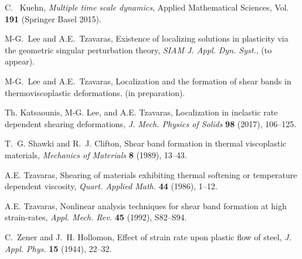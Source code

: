\documentclass[graybox]{svmult}
\begin{document}
\begin{thebibliography}{10}
{\sc C.~ Kuehn}, 
{\it Multiple time scale dynamics}, Applied Mathematical Sciences, Vol. {\bf 191} (Springer Basel 2015).
  
{\sc M-G.~Lee and A.E.~Tzavaras},
Existence of localizing solutions in plasticity via the geometric singular perturbation theory, 
{\em SIAM J. Appl. Dyn. Syst.}, (to appear). 

{\sc M-G.~Lee and A.E.~Tzavaras},
Localization and the formation of shear bands in thermoviscoplastic deformations. (in preparation).

{\sc Th. Katsaounis, M-G. Lee, and A.E. Tzavaras}, 
Localization in inelastic rate dependent shearing deformations, 
{\em J.  Mech. Physics of Solids} {\bf 98} (2017), 106--125.


{\sc T.~G. Shawki and R.~J. Clifton}, 
Shear band formation in thermal viscoplastic materials, 
{\em Mechanics of Materials} {\bf 8 } (1989), 13--43.

{\sc A.E. Tzavaras},
Shearing of materials exhibiting thermal softening or temperature dependent viscosity,
{\em Quart.  Applied Math.} {\bf 44} (1986), 1--12.


{\sc A.E. Tzavaras}, 
Nonlinear analysis techniques for shear band formation at high strain-rates, 
{\it Appl. Mech. Rev.}
{\bf  45} (1992), S82--S94.


{\sc C.~Zener and J.~H. Hollomon}, 
Effect of strain rate upon plastic flow of steel,
{\it J. Appl. Phys.}
{\bf 15} (1944), 22--32.
\end{thebibliography}
\end{document}
